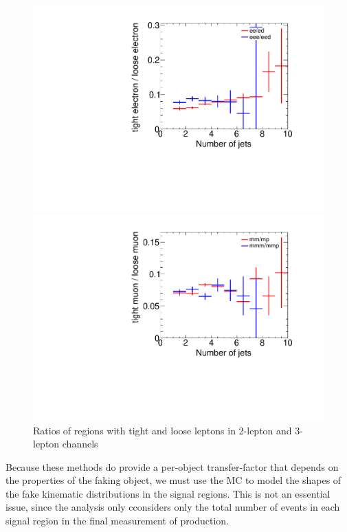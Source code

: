 \begin{figure}[htbp]
\begin{minipage}[h]{0.5\textwidth}
    \centering \includegraphics[width=\textwidth]{figs/fake/compare_2e_3e_NJet_ratios}
\end{minipage}\hfill
\begin{minipage}[h]{0.5\textwidth}
    \centering \includegraphics[width=\textwidth]{figs/fake/compare_2m_3m_NJet_ratios}
\end{minipage}\hfill
\caption{Ratios of regions with tight and loose leptons in 2-lepton and 3-lepton channels}
\label{figure:background_njetr}
\end{figure}

Because these methods do provide a per-object transfer-factor that depends on the properties of the faking object, we must use the MC to model the shapes of the fake kinematic distributions in the signal regions. This is not an essential issue, since the analysis only cconsiders only the total number of events in each signal region in the final measurement of \tth production.

